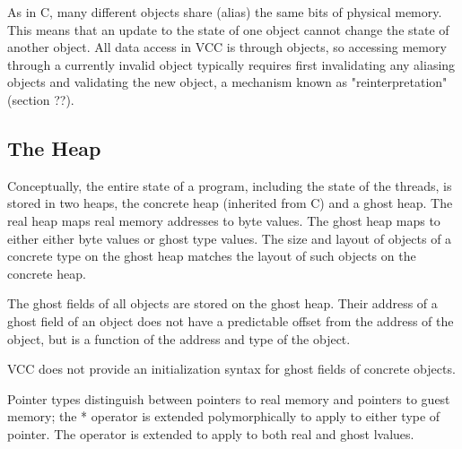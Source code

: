 \documentclass[preprint,nocopyrightspace]{sigplanconf}
\begin{document}
{As in C, many different objects share (alias) the same bits of
physical memory. This means that an update to the state of
one \vcc{\valid} object cannot change the state of
another \vcc{\valid} object. All data access in VCC is
through \vcc{\valid} objects, so accessing memory through a currently
invalid object typically requires first invalidating any aliasing
objects and validating the new object, a mechanism known as
"reinterpretation" (section ??). 

\subsection{The Heap}

Conceptually, the entire state of a program, including the state of
the threads, is stored in two heaps, the concrete heap (inherited from
C) and a ghost heap. The real heap maps real memory addresses to byte
values. The ghost heap maps \vcc{\natural} to either either byte
values or ghost type values. 
The size and layout of objects of a concrete type on the ghost heap
matches the layout of such objects on the concrete heap.  

The ghost fields of all objects are stored on the ghost heap. Their
address of a ghost field of an object does not have a predictable
offset from the address of the object, but is a function of the
address and type of the object.  

VCC does not provide an initialization syntax for ghost fields of concrete objects. 

Pointer types distinguish between pointers to real memory and pointers
to guest memory; the * operator is extended polymorphically to apply
to either type of pointer. The \vcc{&} operator is extended to apply
to both real and ghost lvalues. 

}
\end{document}
